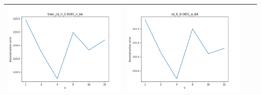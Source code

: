 \documentclass[12pt]{report}
\begin{document}
\begin{table}[H]
\begin{tabular}{ | c | c | c | c |}
\begin{minipage}{.3\textwidth}
      \includegraphics[scale=0.25]{train_cd_lr_0_0001_n_64.png}
    \end{minipage} &
    \begin{minipage}{.3\textwidth}
      \includegraphics[scale=0.25]{cd_lr_0_0001_n_64.png}
    \end{minipage}
    \\ \hline
  \end{tabular}
\end{table}
\end{document}
